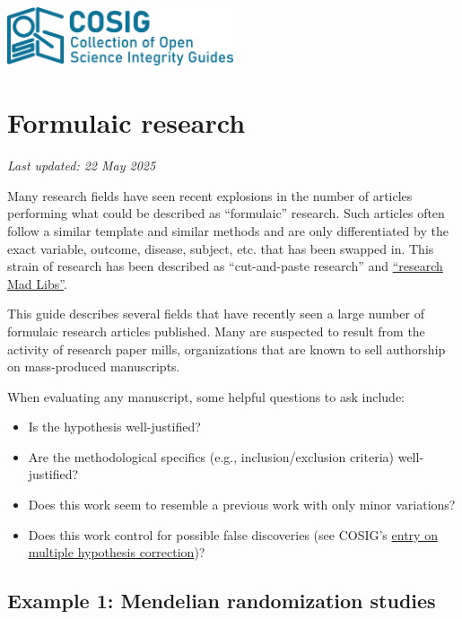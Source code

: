 \documentclass[letterpaper, 12pt]{article}
\begin{document}
\flushleft
\includegraphics[width=0.5\textwidth]{img/home/241017_final_logo_mockup.png}

\section*{Formulaic research}
\textit{Last updated: 22 May 2025}

Many research fields have seen recent explosions in the number of articles performing what could be described as ``formulaic'' research. Such articles often follow a similar template and similar methods and are only differentiated by the exact variable, outcome, disease, subject, etc. that has been swapped in. This strain of research has been described as ``cut-and-paste research'' and \href{https://doi.org/10.1126/science.zgawnij}{``research Mad Libs\textregistered''}. 

This guide describes several fields that have recently seen a large number of formulaic research articles published. Many are suspected to result from the activity of research paper mills, organizations that are known to sell authorship on mass-produced manuscripts.

When evaluating any manuscript, some helpful questions to ask include:

\begin{itemize}
    \setlength\itemsep{-0.5em}
    \item Is the hypothesis well-justified?
    \item Are the methodological specifics (e.g., inclusion/exclusion criteria) well-justified?
    \item Does this work seem to resemble a previous work with only minor variations?
    \item Does this work control for possible false discoveries (see COSIG's \href{https://osf.io/csxd5}{entry on multiple hypothesis correction})?
\end{itemize}

\subsection*{Example 1: Mendelian randomization studies}
\end{document}
